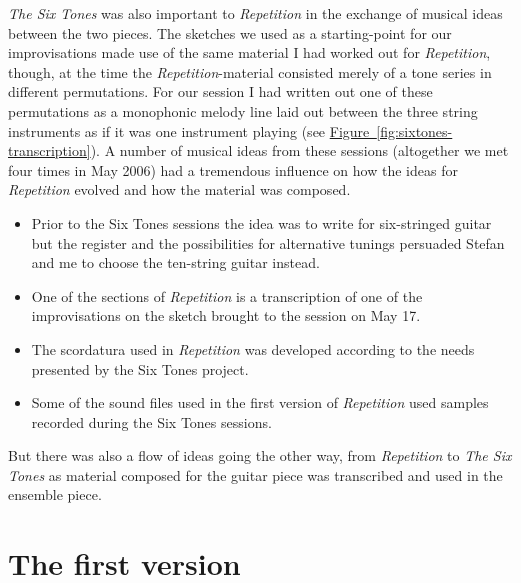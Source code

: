 \emph{The Six Tones} was also important to \emph{Repetition} in the exchange of musical ideas between the two pieces. The sketches we used as a starting-point for our improvisations made use of the same material I had worked out for \emph{Repetition}, though, at the time the \emph{Repetition}-material consisted merely of a tone series in different permutations. For our session I had written out one of these permutations as a monophonic melody line laid out between the three string instruments as if it was one instrument playing (see \hyperref[fig:sixtones-transcription]{Figure~\ref*{fig:sixtones-transcription}}). A number of musical ideas from these sessions (altogether we met four times in May 2006) had a tremendous influence on how the ideas for \emph{Repetition} evolved and how the material was composed.
\begin{itemize}
\item Prior to the Six Tones sessions the idea was to write for six-stringed guitar but the register and the possibilities for alternative tunings persuaded Stefan and me to choose the ten-string guitar instead. 
\item One of the sections of \emph{Repetition} is a transcription of one of the improvisations on the sketch brought to the session on May 17.
\item The scordatura used in \emph{Repetition} was developed according to the   needs presented by the Six Tones project.
\item Some of the sound files used in the first version of \emph{Repetition}   used samples recorded during the Six Tones sessions. 
\end{itemize}  
But there was also a flow of ideas going the other way, from \emph{Repetition} to \emph{The Six Tones} as material composed for the guitar piece was transcribed and used in the ensemble piece.

\section{The first version}
\label{sec:negotiating-3}

